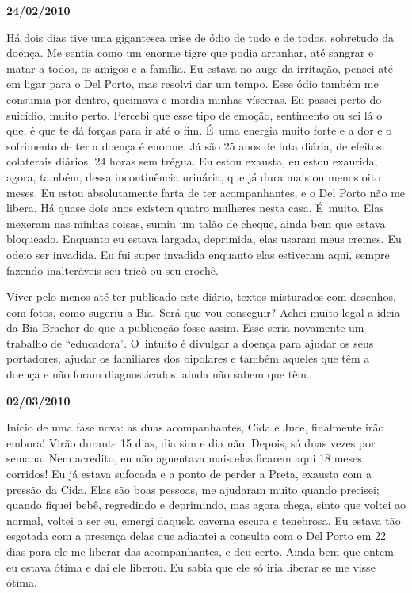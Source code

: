 \begin{center}\textbf{\asterisc{}}\end{center}


\begin{flushright}\textbf{24/02/2010}\end{flushright}


Há dois dias tive uma gigantesca crise de ódio de tudo e de todos,
sobretudo da doença. Me sentia como um enorme tigre que podia arranhar,
até sangrar e matar a todos, os amigos e a família. Eu estava no auge da
irritação, pensei até em ligar para o Del Porto, mas resolvi dar um
tempo. Esse ódio também me consumia por dentro, queimava e mordia minhas
vísceras. Eu passei perto do suicídio, muito perto. Percebi que esse
tipo de emoção, sentimento ou sei lá o que, é que te dá forças para ir
até o fim. É~uma energia muito forte e a dor e o sofrimento de ter a
doença é enorme. Já são 25 anos de luta diária, de efeitos colaterais
diários, 24 horas sem trégua. Eu estou exausta, eu estou exaurida,
agora, também, dessa incontinência urinária, que já dura mais ou menos
oito meses. Eu estou absolutamente farta de ter acompanhantes, e o Del
Porto não me libera. Há quase dois anos existem quatro mulheres nesta
casa. É~muito. Elas mexeram nas minhas coisas, sumiu um talão de cheque,
ainda bem que estava bloqueado. Enquanto eu estava largada, deprimida,
elas usaram meus cremes. Eu odeio ser invadida. Eu fui super
invadida enquanto elas estiveram aqui, sempre fazendo inalteráveis seu
tricô ou seu crochê.

Viver pelo menos até ter publicado este diário, textos misturados com
desenhos, com fotos, como sugeriu a Bia. Será que vou conseguir? Achei
muito legal a ideia da Bia Bracher de que a publicação fosse assim. Esse
seria novamente um trabalho de ``educadora''. O~intuito é divulgar a
doença para ajudar os seus portadores, ajudar os familiares dos
bipolares e também aqueles que têm a doença e não foram diagnosticados,
ainda não sabem que têm.

\begin{center}\textbf{\asterisc{}}\end{center}


\textbf{}

\begin{flushright}\textbf{02/03/2010}\end{flushright}


Início de uma fase nova: as duas acompanhantes, Cida e Juce, finalmente
irão embora! Virão durante 15 dias, dia sim e dia não. Depois, só duas
vezes por semana. Nem acredito, eu não aguentava mais elas ficarem aqui
18 meses corridos! Eu já estava sufocada e a ponto de perder a Preta,
exausta com a pressão da Cida. Elas são boas pessoas, me ajudaram muito
quando precisei; quando fiquei bebê, regredindo e deprimindo, mas agora
chega, sinto que voltei ao normal, voltei a ser eu, emergi daquela
caverna escura e tenebrosa. Eu estava tão esgotada com a presença delas
que adiantei a consulta com o Del Porto em 22 dias para ele me liberar
das acompanhantes, e deu certo. Ainda bem que ontem eu estava ótima e
daí ele liberou. Eu sabia que ele só iria liberar se me visse ótima.

